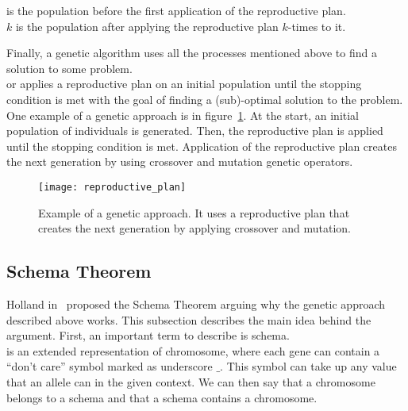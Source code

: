  is the population before the first application of the reproductive plan.\\

 $k$ is the population after applying the reproductive plan $k$-times to it.\\

\newpage

Finally, a genetic algorithm uses all the processes mentioned above to
find a solution to some problem.\\

 or  applies a reproductive plan
on an initial population until the stopping condition is met with the
goal of finding a (sub)-optimal solution to the problem.\\

One example of a genetic approach is in figure~\ref{fig:reproductive-plan}.
At the start, an initial population of individuals is generated.
Then, the reproductive plan is applied until the stopping condition is met.
Application of the reproductive plan creates the next generation by using crossover and mutation genetic operators.

\begin{figure}[h]
    \texttt{[image: reproductive\_plan]}
    \caption[Example of a genetic approach]{
        Example of a genetic approach.
        It uses a reproductive plan that creates the next generation by applying crossover and mutation.}
    \label{fig:reproductive-plan}
\end{figure}

\subsection{Schema Theorem}\label{subsec:schema-theorem}

Holland in~\cite{hollandAdaptationNaturalArtificial1975} proposed
the Schema Theorem arguing why the genetic approach described above works.
This subsection describes the main idea behind the argument.
First, an important term to describe is schema.\\

 is an extended representation of chromosome,
where each gene can contain a “don’t care” symbol marked as underscore $\_$.
This symbol can take up any value that an allele can in the given context.
We can then say that a chromosome belongs to a schema
and that a schema contains a chromosome.\\


